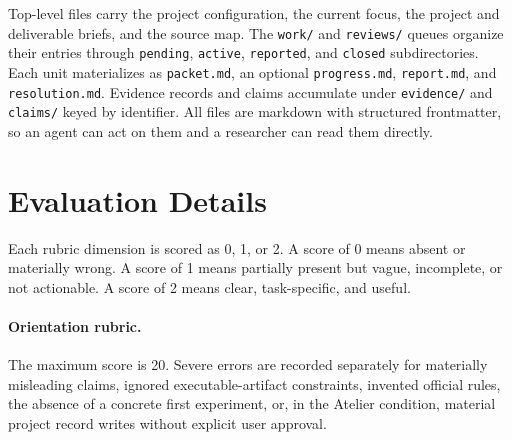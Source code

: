 Top-level files carry the project configuration, the current focus, the project and deliverable briefs, and the source map. The \texttt{work/} and \texttt{reviews/} queues organize their entries through \texttt{pending}, \texttt{active}, \texttt{reported}, and \texttt{closed} subdirectories. Each unit materializes as \texttt{packet.md}, an optional \texttt{progress.md}, \texttt{report.md}, and \texttt{resolution.md}. Evidence records and claims accumulate under \texttt{evidence/} and \texttt{claims/} keyed by identifier. All files are markdown with structured frontmatter, so an agent can act on them and a researcher can read them directly.

\section{Evaluation Details}
\label{app:evaluation-details}

Each rubric dimension is scored as 0, 1, or 2. A score of 0 means absent or materially wrong. A score of 1 means partially present but vague, incomplete, or not actionable. A score of 2 means clear, task-specific, and useful.

\paragraph{Orientation rubric.}
The maximum score is 20. Severe errors are recorded separately for materially misleading claims, ignored executable-artifact constraints, invented official rules, the absence of a concrete first experiment, or, in the Atelier condition, material project record writes without explicit user approval.

